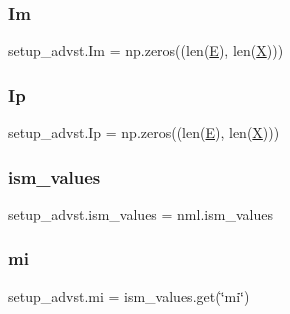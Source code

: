 \subsubsection{\texorpdfstring{Im}{Im}}
{\footnotesize\ttfamily setup\+\_\+advst.\+Im = np.\+zeros((len(\hyperlink{namespacesetup__advst_a846b33b3abeae0f60876a6d51bb0ae79}{E}), len(\hyperlink{namespacesetup__advst_a4fe22219bfc7363b6decb33a0885e17a}{X})))}

\mbox{\label{namespacesetup__advst_a6423fe2a4edc49b5c51eda9b76d6d3a6}} 
\subsubsection{\texorpdfstring{Ip}{Ip}}
{\footnotesize\ttfamily setup\+\_\+advst.\+Ip = np.\+zeros((len(\hyperlink{namespacesetup__advst_a846b33b3abeae0f60876a6d51bb0ae79}{E}), len(\hyperlink{namespacesetup__advst_a4fe22219bfc7363b6decb33a0885e17a}{X})))}

\mbox{\label{namespacesetup__advst_a2c8aac5411f119328f0fc506a3ed8498}} 
\subsubsection{\texorpdfstring{ism\+\_\+values}{ism\_values}}
{\footnotesize\ttfamily setup\+\_\+advst.\+ism\+\_\+values = nml.\+ism\+\_\+values}

\mbox{\label{namespacesetup__advst_ac7afd5680fa2723246cba3b6815e77cf}} 
\subsubsection{\texorpdfstring{mi}{mi}}
{\footnotesize\ttfamily setup\+\_\+advst.\+mi = ism\+\_\+values.\+get(\char`\"{}mi\char`\"{})}

\mbox{\label{namespacesetup__advst_a86a255a04ac9cb76649f6926808b8f39}} 
